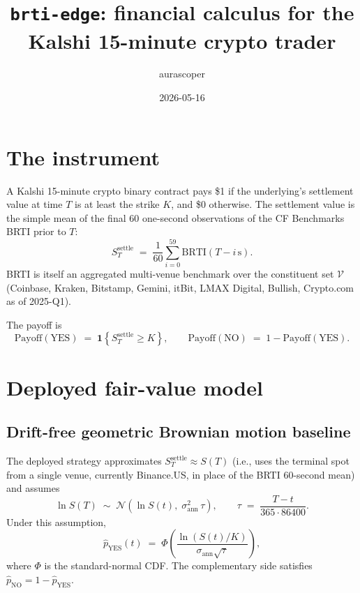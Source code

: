 \documentclass[11pt]{article}
\title{\texttt{brti-edge}: financial calculus for the Kalshi 15-minute crypto trader}
\author{aurascoper}
\date{2026-05-16}
\begin{document}
\maketitle

\section{The instrument}

A Kalshi 15-minute crypto binary contract pays \$1 if the underlying's settlement value at time $T$ is at least the strike $K$, and \$0 otherwise. The settlement value is the simple mean of the final 60 one-second observations of the CF Benchmarks BRTI prior to $T$:
\begin{equation}
S_T^{\text{settle}} \;=\; \frac{1}{60}\sum_{i=0}^{59} \text{BRTI}(T - i\,\text{s}).
\end{equation}
BRTI is itself an aggregated multi-venue benchmark over the constituent set $\mathcal{V}$ (Coinbase, Kraken, Bitstamp, Gemini, itBit, LMAX Digital, Bullish, Crypto.com as of 2025-Q1).

The payoff is
\begin{equation}
\mathrm{Payoff}(\text{YES}) \;=\; \mathbf{1}\!\left\{S_T^{\text{settle}} \geq K\right\},\qquad
\mathrm{Payoff}(\text{NO}) \;=\; 1 - \mathrm{Payoff}(\text{YES}).
\end{equation}

\section{Deployed fair-value model}

\subsection{Drift-free geometric Brownian motion baseline}

The deployed strategy approximates $S_T^{\text{settle}} \approx S(T)$ (i.e., uses the terminal spot from a single venue, currently Binance.US, in place of the BRTI 60-second mean) and assumes
\begin{equation}
\ln S(T) \;\sim\; \mathcal{N}\!\left(\ln S(t),\; \sigma_{\text{ann}}^{2}\,\tau\right),\qquad
\tau \;=\; \frac{T - t}{365\cdot 86400}.
\end{equation}
Under this assumption,
\begin{equation}
\hat p_{\text{YES}}(t) \;=\; \Phi\!\left(\frac{\ln(S(t)/K)}{\sigma_{\text{ann}}\sqrt{\tau}}\right),
\label{eq:naive}
\end{equation}
where $\Phi$ is the standard-normal CDF. The complementary side satisfies $\hat p_{\text{NO}} = 1 - \hat p_{\text{YES}}$.
\end{document}
